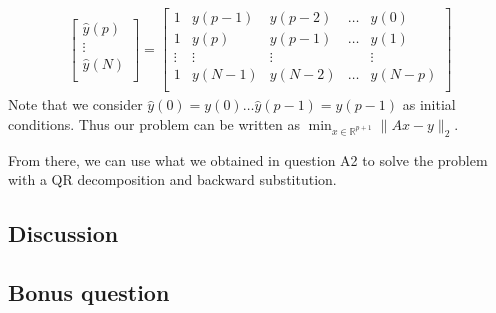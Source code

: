 \documentclass[11pt]{article}
\begin{document}
\begin{align*}
\begin{bmatrix}
\hat{y}(p)\\
\vdots\\
\hat{y}(N)\\
\end{bmatrix}= \begin{bmatrix}
1 & y(p-1)& y(p-2)&\dots& y(0)\\
1 & y(p)&y(p-1)&\dots& y(1)\\
\vdots&\vdots &\vdots&&\vdots\\
1& y(N-1)&y(N-2)&\dots& y(N-p)\\
\end{bmatrix}
\end{align*}
Note that we consider $\hat{y}(0) = y(0)\dots \hat{y}(p-1) = y(p-1)$ as initial conditions.
Thus our problem can be written as $\min_{x\in\mathbb{R}^{p+1}} \|Ax-y\|_2$.

From there, we can use what we obtained in question A2 to solve the problem with a QR decomposition and backward substitution.
\subsection*{Discussion}
\subsection*{Bonus question}
\end{document}

